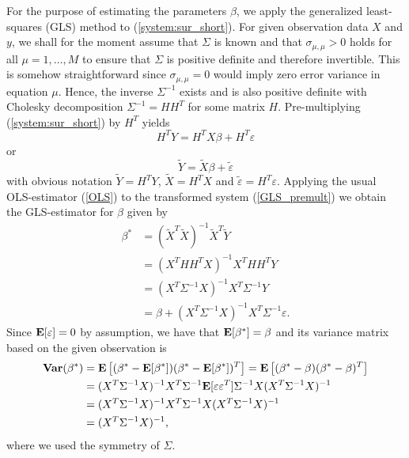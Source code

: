 \documentclass[a4paper, 12pt]{scrreprt}
\newcommand{\ew}{\mbox{\textbf{E}}}
\newcommand{\var}{\mbox{\textbf{Var}}}
\begin{document}
For the purpose of estimating the parameters $\beta$, we apply the generalized least-squares (GLS) method to (\ref{system:sur_short}).
For given observation data $X$ and $y$, we shall for the moment assume that $\Sigma$ is known and that $\sigma_{\mu,\mu} > 0$ holds for all $\mu =1,\ldots,M$ to ensure that $\Sigma$ is positive definite and therefore invertible. This is somehow straightforward since $\sigma_{\mu,\mu}=0$ would imply zero error variance in equation $\mu$. Hence, the inverse $\Sigma^{-1}$ exists and is also positive definite with Cholesky decomposition $\Sigma^{-1} = H H^T$ for some matrix $H$. 
Pre-multiplying (\ref{system:sur_short}) by $H^T$ yields
\begin{equation}
H^T Y=H^T X\beta+H^T \varepsilon
\end{equation}
or 
\begin{equation}\label{GLS_premult}
\tilde{Y} = \tilde{X}\beta + \tilde{\varepsilon}
\end{equation}
with obvious notation $\tilde{Y} = H^T Y$, $\tilde{X} = H^T X$ and $\tilde{\varepsilon} = H^T \varepsilon$. Applying the usual OLS-estimator (\ref{OLS}) to the transformed system (\ref{GLS_premult}) we obtain the GLS-estimator for $\beta$ given by
\begin{align}
\beta^* &= (\tilde{X}^T \tilde{X})^{-1} \tilde{X}^T \tilde{Y} \nonumber \\
&= (X^T H H^T X)^{-1}X^T H H^T Y \nonumber \\
&= (X^T \Sigma^{-1} X)^{-1} X^T \Sigma^{-1} Y \label{GLS} \\
& = \beta + (X^T \Sigma^{-1} X)^{-1} X^T \Sigma^{-1} \varepsilon. \nonumber
\end{align}
Since $\ew[\varepsilon] = 0$ by assumption, we have that $\ew[\beta^*] = \beta$ and its variance matrix based on the given observation is
\begin{align*}
\var(\beta^*) &= \ew\left[(\beta^* - \ew[\beta^*])(\beta^* - \ew[\beta^*])^T\right] = \ew\left[(\beta^* - \beta)(\beta^* - \beta)^T\right] \\
 &= (X^T \Sigma^{-1} X)^{-1} X^T \Sigma^{-1} \ew[ \varepsilon \varepsilon^T ]  \Sigma^{-1} X (X^T \Sigma^{-1} X)^{-1} \\
 &= (X^T \Sigma^{-1} X)^{-1} X^T  \Sigma^{-1} X (X^T \Sigma^{-1} X)^{-1} \\
 &= (X^T \Sigma^{-1} X)^{-1},
\end{align*}
where we used the symmetry of $\Sigma$.
\end{document}
